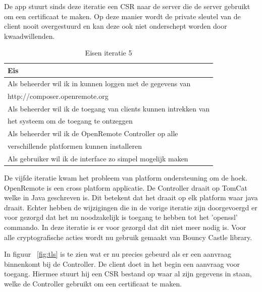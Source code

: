 \documentclass[]{article}
\begin{document}
De app stuurt sinds deze iteratie een CSR naar de server die de server
gebruikt om een certificaat te maken. Op deze manier wordt de private
sleutel van de client nooit overgestuurd en kan deze ook niet onderschept
worden door kwaadwillenden.

\begin{table}[htpb]
  \caption{Eisen iteratie 5}
  \begin{center}
    \begin{tabular}{|| l ||}\hline
        Eis                                                              \\\hline\hline
        Als beheerder wil ik in kunnen loggen met de gegevens van        \\
        http://composer.openremote.org                                   \\\hline
        Als beheerder wil ik de toegang van clients kunnen intrekken van \\ 
        het systeem om de toegang te ontzeggen                           \\\hline
        Als beheerder wil ik de OpenRemote Controller op alle            \\ 
        verschillende platformen kunnen installeren                      \\\hline
        Als gebruiker wil ik de interface zo simpel mogelijk maken       \\\hline
    \end{tabular}
  \end{center}
\end{table}

De vijfde iteratie kwam het probleem van platform ondersteuning om de hoek.
OpenRemote is een cross platform applicatie. De Controller draait op TomCat
welke in Java geschreven is. Dit betekent dat het draait op elk platform waar
java draait. Echter hebben de wijzigingen die in de vorige iteratie zijn
doorgevoergd er voor gezorgd dat het nu noodzakelijk is toegang te hebben tot
het 'openssl' commando. In deze iteratie is er voor gezorgd dat dit niet meer
nodig is. Voor alle cryptografische acties wordt nu gebruik gemaakt van Bouncy
Castle library. 

In figuur ~\ref{fig:tls} is te zien wat er nu precies gebeurd als er een
aanvraag binnenkomt bij de Controller. De client doet in het begin een aanvraag
voor toegang. Hiermee stuurt hij een CSR bestand op waar al zijn gegevens in staan,
welke de Controller gebruikt om een certificaat te maken. 
\end{document}
